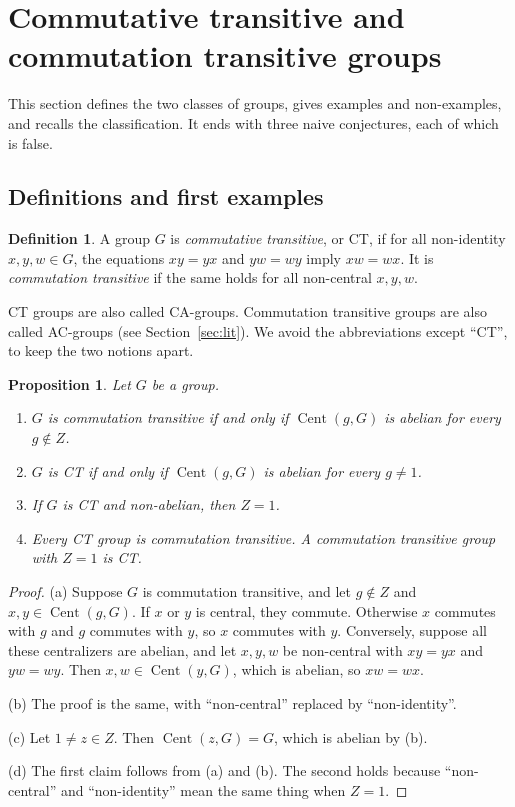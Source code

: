 \documentclass[12pt,letterpaper]{article}
\numberwithin{equation}{section}
\theoremstyle{plain}
\newtheorem{proposition}[theorem]{Proposition}
\theoremstyle{definition}
\newtheorem{definition}[theorem]{Definition}
\DeclareMathOperator{\Cent}{Cent}
\begin{document}
\section{Commutative transitive and commutation transitive groups}
\label{sec:ct}

This section defines the two classes of groups, gives examples and
non-examples, and recalls the classification. It ends with three naive
conjectures, each of which is false.

\subsection{Definitions and first examples}\label{sec:defs}

\begin{definition}\label{def:ct}
A group $G$ is \emph{commutative transitive}, or CT, if for all non-identity
$x,y,w\in G$, the equations $xy=yx$ and $yw=wy$ imply $xw=wx$. It is
\emph{commutation transitive} if the same holds for all non-central
$x,y,w$.
\end{definition}

CT groups are also called CA-groups. Commutation transitive groups are also
called AC-groups (see Section~\ref{sec:lit}). We avoid the abbreviations
except ``CT'', to keep the two notions apart.

\begin{proposition}\label{prop:basic}
Let $G$ be a group.
\begin{enumerate}[label=(\alph*),itemsep=1pt]
\item $G$ is commutation transitive if and only if $\Cent(g,G)$ is abelian
  for every $g\notin Z$.
\item $G$ is CT if and only if $\Cent(g,G)$ is abelian for every $g\neq1$.
\item If $G$ is CT and non-abelian, then $Z=1$.
\item Every CT group is commutation transitive. A commutation transitive
  group with $Z=1$ is CT.
\end{enumerate}
\end{proposition}

\begin{proof}
(a) Suppose $G$ is commutation transitive, and let $g\notin Z$ and
$x,y\in\Cent(g,G)$. If $x$ or $y$ is central, they commute. Otherwise $x$
commutes with $g$ and $g$ commutes with $y$, so $x$ commutes with $y$.
Conversely, suppose all these centralizers are abelian, and let $x,y,w$ be
non-central with $xy=yx$ and $yw=wy$. Then $x,w\in\Cent(y,G)$, which is
abelian, so $xw=wx$.

(b) The proof is the same, with ``non-central'' replaced by
``non-identity''.

(c) Let $1\neq z\in Z$. Then $\Cent(z,G)=G$, which is abelian by (b).

(d) The first claim follows from (a) and (b). The second holds because
``non-central'' and ``non-identity'' mean the same thing when $Z=1$.
\end{proof}
\end{document}
